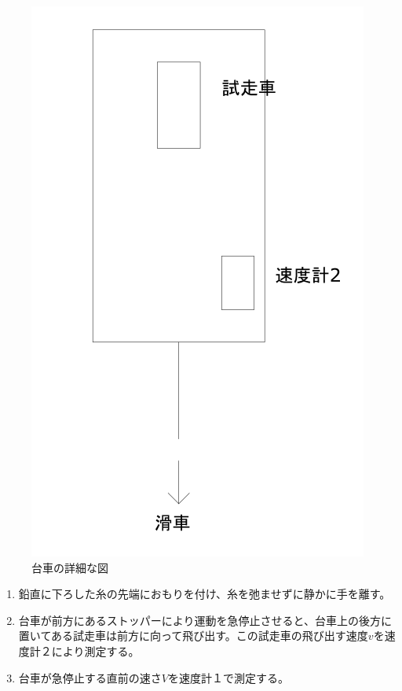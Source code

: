 \documentclass{jlreq}
\begin{document}
\begin{figure}[H]
  \centering
  \includegraphics[scale=0.5]{zikkenzu2.png}
  \caption{台車の詳細な図}    
\end{figure}
  \begin{enumerate}
    \item 鉛直に下ろした糸の先端におもりを付け、糸を弛ませずに静かに手を離す。
    \item 台車が前方にあるストッパーにより運動を急停止させると、台車上の後方に置いてある試走車は前方に向って飛び出す。この試走車の飛び出す速度$v$を速度計２により測定する。
    \item 台車が急停止する直前の速さ$V$を速度計１で測定する。
  \end{enumerate}
\end{document}
